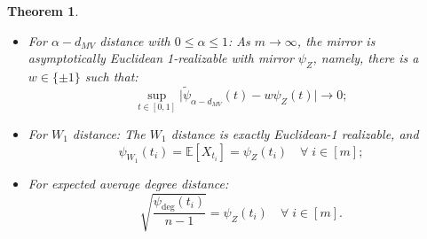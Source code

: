 \documentclass[12pt]{article}
\newcommand{\EE}{\mathbb{E}}
\newtheorem{thm}{Theorem}
\theoremstyle{definition}
\begin{document}
\begin{thm}
\begin{itemize}

\item For $\alpha-d_{MV}$ distance with $0\le\alpha\leq 1$: As $m \to \infty$, the mirror is asymptotically Euclidean 1-realizable with mirror $\psi_Z$, namely, there is a $w\in\{\pm1\}$ such that:
$$
\sup_{t \in [0,1] } \bigg|\tilde{\psi}_{\alpha-d_{MV}}(t)-w\psi_Z(t)\bigg| \to 0;
$$

\item For $W_1$ distance: The $W_1$ distance is exactly Euclidean-1 realizable, and
$$
\psi_{W_1}(t_i) =\EE[X_{t_i}] =  \psi_Z(t_i)\quad  \forall\; i \in [m]; 
$$  

\item For expected average degree distance:
$$
\sqrt{ \frac {\psi_{\text{deg} }\left(t_i\right) }{n-1}} = \psi_Z(t_i)\quad \forall\;i\in[m].
$$

\end{itemize}
\end{thm}
\end{document}
